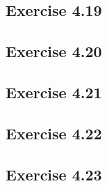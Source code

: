 \documentclass[../A&R.tex]{subfiles}
\begin{document}
\subsection*{Exercise 4.19}

\subsection*{Exercise 4.20}

\subsection*{Exercise 4.21}

\subsection*{Exercise 4.22}

\subsection*{Exercise 4.23}
\phantom{}
\end{document}
